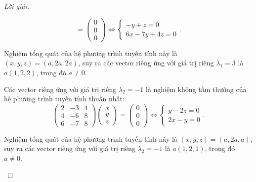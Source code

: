 \documentclass[class=linearalgebra,crop=false]{standalone}
\begin{document}
\begin{proof}[Lời giải]
\begin{enumerate}[label = (\alph*)]
\[                  =
                  \begin{pmatrix}
                      0 \\
                      0 \\
                      0
                  \end{pmatrix}
                  \Longleftrightarrow
                  \begin{cases}
                      -y + z = 0 \\
                      6x - 7y + 4z = 0
                  \end{cases}.
              \]
              \par Nghiệm tổng quát của hệ phương trình tuyến tính này là $(x, y, z) = (a, 2a, 2a)$, suy ra các vector riêng ứng với giá trị riêng $\lambda_{1} = 3$ là $a(1, 2, 2)$, trong đó $a \ne 0$.
              \bigskip
              \par Các vector riêng ứng với giá trị riêng $\lambda_{2} = -1$ là nghiệm không tầm thường của hệ phương trình tuyến tính thuần nhất:
              \[
                  \begin{pmatrix}
                      2 & -3 & 4 \\
                      4 & -6 & 8 \\
                      6 & -7 & 8
                  \end{pmatrix}
                  \begin{pmatrix}
                      x \\
                      y \\
                      z
                  \end{pmatrix}
                  =
                  \begin{pmatrix}
                      0 \\
                      0 \\
                      0
                  \end{pmatrix}
                  \Longleftrightarrow
                  \begin{cases}
                      y - 2z = 0 \\
                      2x - y = 0
                  \end{cases}.
              \]
              \par Nghiệm tổng quát của hệ phương trình tuyến tính này là $(x, y, z) = (a, 2a, a)$, suy ra các vector riêng ứng với giá trị riêng $\lambda_{2} = -1$ là $a(1, 2, 1)$, trong đó $a \ne 0$.

\end{enumerate}
\end{proof}
\end{document}
